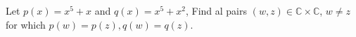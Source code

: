 Let $p(x)=x^5+x$ and $q(x)=x^5+x^2$, Find al pairs $(w,z)\in \mathbb{C}\times\mathbb{C}$, $w\not=z$ for which $p(w)=p(z),q(w)=q(z)$.